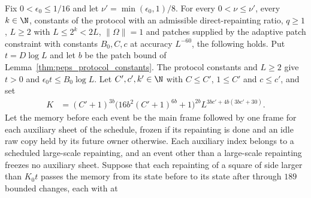 \begin{lemma}
    \label{thm:peps_protocol_from_large_repaintings}
    \leanok
    Fix $0<\epsilon_0\le1/16$ and let $\nu'=\min(\epsilon_0,1)/8$. For every
    $0<\nu\le\nu'$, every $k\in\N$, constants of the protocol with an
    admissible direct-repainting ratio, $q\ge1$, $L\ge2$ with $L\le2^k<2L$,
    $\lVert\Omega\rVert=1$ and patches supplied by the adaptive patch constraint
    with constants $B_0,C,c$ at accuracy $L^{-60}$, the following holds. Put
    $t=D\log L$ and let $b$ be the patch bound of
    Lemma~\ref{thm:peps_protocol_constants}. The protocol constants and $L\ge2$
    give $t>0$ and $\epsilon_0t\le B_0\log L$. Let $C',c',k'\in\N$ with
    $C\le C'$, $1\le C'$ and $c\le c'$, and set
    \begin{align}
        K & =(C'+1)^{3b}\bigl(16b^2(C'+1)^{6b}+1\bigr)^{2b}
        L^{3bc'+4b(3bc'+30)}.
        \label{eq:peps_protocol_rewrite_bound}
    \end{align}
    Let the memory before each event be the main frame followed by one frame for
    each auxiliary sheet of the schedule, frozen if its repainting is done and
    an idle raw copy held by its future owner otherwise. Each auxiliary index
    belongs to a scheduled large-scale repainting, and an event other than a
    large-scale repainting freezes no auxiliary sheet. Suppose that each
    repainting of a square of side larger than $K_0t$ passes the memory from its
    state before to its state after through $189$ bounded changes, each with at

\end{lemma}

